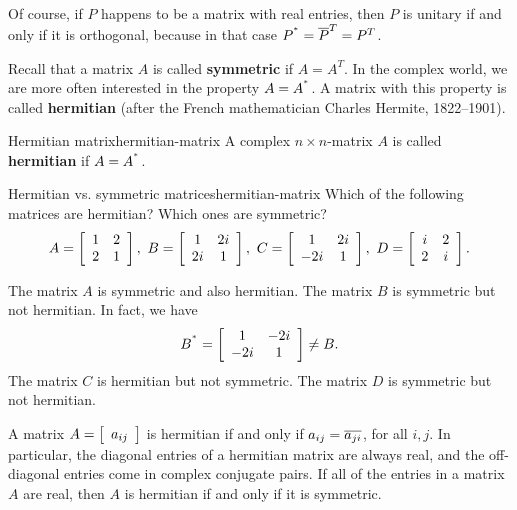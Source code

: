 \documentclass{ximera}
\begin{document}
Of course, if $P$ happens to be a matrix with real entries, then $P$
is unitary if and only if it is orthogonal, because in that case
$P^{\adjoint}=\conjugate{P}^T = P^T$.

Recall that a matrix $A$ is called \textbf{symmetric} if $A=A^T$. In
the complex world, we are more often interested in the property
$A=A^{\adjoint}$. A matrix with this property is called
\textbf{hermitian} (after the French mathematician Charles Hermite,
1822--1901).

\begin{definition}{Hermitian matrix}{hermitian-matrix}
  A complex $n\times n$-matrix $A$ is called \textbf{hermitian}%
  if $A=A^{\adjoint}$.
\end{definition}

\begin{example}{Hermitian vs. symmetric matrices}{hermitian-matrix}
  Which of the following matrices are hermitian? Which ones are
  symmetric?
  \begin{equation*}
    A = \startmat{cc} 1 & 2 \\ 2 & 1 \stopmat, \quad
    B = \startmat{cc} 1 & 2i \\ 2i & 1 \stopmat, \quad
    C = \startmat{cc} 1 & 2i \\ -2i & 1 \stopmat, \quad
    D = \startmat{cc} i & 2 \\ 2 & i \stopmat.
  \end{equation*}
\end{example}

\begin{solution}
  The matrix $A$ is symmetric and also hermitian. The matrix $B$ is
  symmetric but not hermitian. In fact, we have
  \begin{equation*}
    B^{\adjoint} = \startmat{cc} 1 & -2i \\ -2i & 1 \stopmat \neq B.
  \end{equation*}
  The matrix $C$ is hermitian but not symmetric. The matrix $D$ is
  symmetric but not hermitian.
\end{solution}

A matrix $A=\startmat{c}a_{ij}\stopmat$ is hermitian if and only if
$a_{ij} = \conjugate{a_{ji}}$, for all $i,j$. In particular, the
diagonal entries of a hermitian matrix are always real, and the
off-diagonal entries come in complex conjugate pairs. If all of the
entries in a matrix $A$ are real, then $A$ is hermitian if and only if
it is symmetric.
\end{document}
